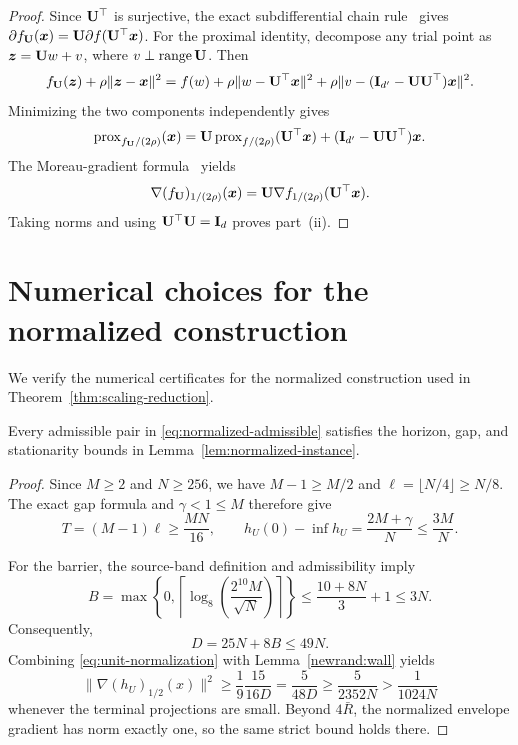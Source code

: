 \begin{appendix}
\begin{proof}
Since ${\mathbf{U}}^\top$ is surjective, the exact subdifferential chain
rule~\cite[Exercise~10.7]{rockafellar2009variational} gives
$\partial f_{{\mathbf{U}}}(\bm{x})={\mathbf{U}}\partial f({\mathbf{U}}^\top\bm{x})$.
For the proximal identity, decompose any trial point as
$\bm{z}={\mathbf{U}} w+v$, where $v\perp\operatorname{range}{\mathbf{U}}$.
Then
\[
 f_{{\mathbf{U}}}(\bm{z})+\rho\|\bm{z}-\bm{x}\|^2
 =f(w)+\rho\|w-{\mathbf{U}}^\top\bm{x}\|^2
  +\rho\|v-({\mathbf{I}}_{d'}-{\mathbf{U}}{\mathbf{U}}^\top)\bm{x}\|^2.
\]
Minimizing the two components independently gives
\begin{equation}
 \operatorname{prox}_{f_{{\mathbf{U}}}/(2\rho)}(\bm{x})
 ={\mathbf{U}}\operatorname{prox}_{f/(2\rho)}({\mathbf{U}}^\top\bm{x})
   +({\mathbf{I}}_{d'}-{\mathbf{U}}{\mathbf{U}}^\top)\bm{x}.
 \label{eq:prox}
\end{equation}
The Moreau-gradient formula~\cite[Lemma 2.2]{DavisDrusvyatskiy2019} yields
\[
 \nabla(f_{{\mathbf{U}}})_{1/(2\rho)}(\bm{x})
 ={\mathbf{U}}\nabla f_{1/(2\rho)}({\mathbf{U}}^\top\bm{x}).
\]
Taking norms and using ${\mathbf{U}}^\top{\mathbf{U}}={\mathbf{I}}_d$ proves part~(ii).
\end{proof}

\section{Numerical choices for the normalized construction}
\label{app:numerical-choices}

We verify the numerical certificates for the normalized
construction used in Theorem~\ref{thm:scaling-reduction}.

\begin{lemma}
\label{lem:normalized-constants}
Every admissible pair in \eqref{eq:normalized-admissible} satisfies
the horizon, gap, and stationarity bounds in
Lemma~\ref{lem:normalized-instance}.
\end{lemma}
\begin{proof}
Since $M\ge2$ and $N\ge256$, we have $M-1\ge M/2$ and
$\ell=\lfloor N/4\rfloor\ge N/8$. The exact gap formula and
$\gamma<1\le M$ therefore give
\[
 T=(M-1)\ell\ge\frac{MN}{16},\qquad
 h_U(0)-\inf h_U
 =\frac{2M+\gamma}{N}\le\frac{3M}{N}.
\]

For the barrier, the source-band definition and admissibility imply
\[
 B=\max\left\{0,
       \left\lceil\log_8\left(\frac{2^{10}M}{\sqrt N}\right)
                    \right\rceil\right\}
 \le\frac{10+8N}{3}+1\le3N.
\]
Consequently,
\begin{equation}
 D=25N+8B\le49N.
 \label{newrand:numerical-margin}
\end{equation}
Combining \eqref{eq:unit-normalization} with
Lemma~\ref{newrand:wall} yields
\[
 \|\nabla(h_U)_{1/2}(x)\|^2
 \ge\frac19\frac{15}{16D}
 =\frac5{48D}
 \ge\frac5{2352N}
 >\frac1{1024N}
\]
whenever the terminal projections are small. Beyond $4\bar R$,
the normalized envelope gradient has norm exactly one, so the
same strict bound holds there.
\end{proof}


\end{appendix}
